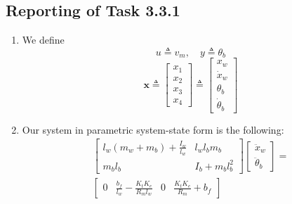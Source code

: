\documentclass[11pt]{article} %
\begin{document}
\subsection*{Reporting of Task 3.3.1}
\begin{enumerate}
\item %
  We define
  \begin{equation*}
    u \triangleq v_m, \quad
    y \triangleq \theta_b
  \end{equation*}
  \begin{equation*}
    \bm{x} \triangleq \begin{bmatrix}
      x_1\\
      x_2\\
      x_3\\
      x_4
    \end{bmatrix}
    \triangleq
    \begin{bmatrix}
      x_w\\
      \dot{x}_w\\
      \theta_b\\
      \dot{\theta}_b
    \end{bmatrix}
  \end{equation*}
\item %
  Our system in parametric system-state form is the following:
  \begin{equation*}
    \begin{aligned}
      \begin{bmatrix}
        l_w(m_w + m_b) + \frac{I_w}{l_w} &
        l_w l_b m_b \\
        m_b l_b &
        I_b + m_b l_b^2
      \end{bmatrix}
      \begin{bmatrix}
        \ddot{x}_w \\
        \ddot{\theta}_b
      \end{bmatrix}
      =\\
      \begin{bmatrix}
        0 &
        \frac{b_f}{l_w} - \frac{K_t K_e}{R_m l_w} &
        0 &
        \frac{K_t K_e}{R_m} + b_f

\end{bmatrix}
\end{aligned}
\end{equation*}
\end{enumerate}
\end{document}
